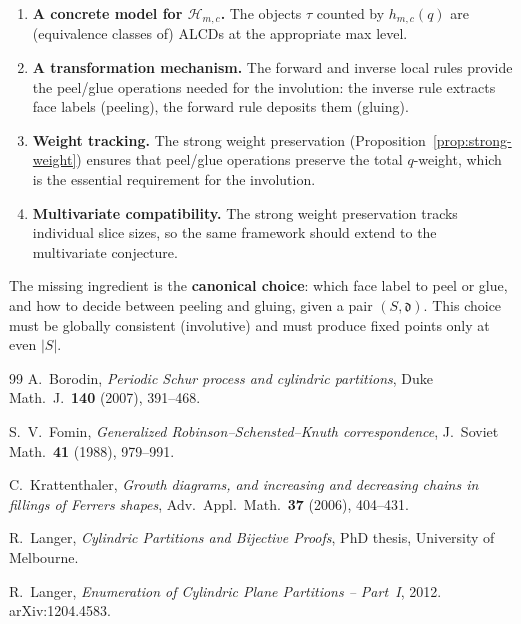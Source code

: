 \documentclass[11pt]{article}
\theoremstyle{plain}
\theoremstyle{definition}
\begin{document}
\begin{enumerate}
  \item \textbf{A concrete model for $\mathcal{H}_{m,c}$.}
    The objects $\tau$ counted by $h_{m,c}(q)$ are (equivalence classes
    of) ALCDs at the appropriate max level.

  \item \textbf{A transformation mechanism.}
    The forward and inverse local rules provide the peel/glue operations
    needed for the involution: the inverse rule extracts face labels
    (peeling), the forward rule deposits them (gluing).

  \item \textbf{Weight tracking.}
    The strong weight preservation (Proposition~\ref{prop:strong-weight})
    ensures that peel/glue operations preserve the total $q$-weight,
    which is the essential requirement for the involution.

  \item \textbf{Multivariate compatibility.}
    The strong weight preservation tracks individual slice sizes, so the
    same framework should extend to the multivariate conjecture.
\end{enumerate}

The missing ingredient is the \textbf{canonical choice}: which face
label to peel or glue, and how to decide between peeling and gluing,
given a pair $(S, \mathfrak{d})$.  This choice must be globally
consistent (involutive) and must produce fixed points only at
even $|S|$.

\begin{thebibliography}{99}
  A.~Borodin,
  \emph{Periodic Schur process and cylindric partitions},
  Duke Math.~J.\ \textbf{140} (2007), 391--468.

  S.~V.~Fomin,
  \emph{Generalized Robinson--Schensted--Knuth correspondence},
  J.\ Soviet Math.\ \textbf{41} (1988), 979--991.

  C.~Krattenthaler,
  \emph{Growth diagrams, and increasing and decreasing chains in
  fillings of Ferrers shapes},
  Adv.\ Appl.\ Math.\ \textbf{37} (2006), 404--431.

  R.~Langer,
  \emph{Cylindric Partitions and Bijective Proofs},
  PhD thesis, University of Melbourne.

  R.~Langer,
  \emph{Enumeration of Cylindric Plane Partitions -- Part~I},
  2012. arXiv:1204.4583.
\end{thebibliography}
\end{document}
